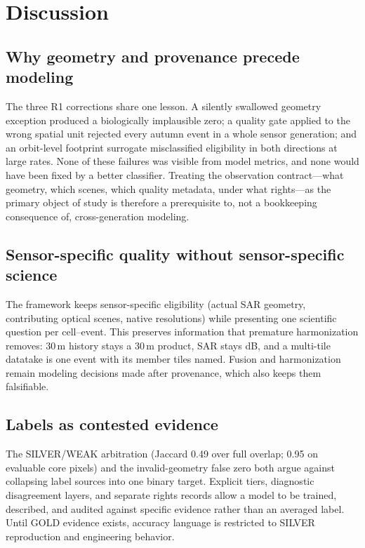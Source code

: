 \section{Discussion}\label{sec:discussion}

\subsection{Why geometry and provenance precede modeling}
The three R1 corrections share one lesson. A silently swallowed
geometry exception produced a biologically implausible zero; a quality
gate applied to the wrong spatial unit rejected every autumn event in a
whole sensor generation; and an orbit-level footprint surrogate
misclassified eligibility in both directions at large rates. None of
these failures was visible from model metrics, and none would have been
fixed by a better classifier. Treating the observation contract---what
geometry, which scenes, which quality metadata, under what rights---as
the primary object of study is therefore a prerequisite to, not a
bookkeeping consequence of, cross-generation modeling.

\subsection{Sensor-specific quality without sensor-specific science}
The framework keeps sensor-specific eligibility (actual SAR geometry,
contributing optical scenes, native resolutions) while presenting one
scientific question per cell--event. This preserves information that
premature harmonization removes: 30\,m history stays a 30\,m product,
SAR stays dB, and a multi-tile datatake is one event with its member
tiles named. Fusion and harmonization remain modeling decisions made
after provenance, which also keeps them falsifiable.

\subsection{Labels as contested evidence}
The SILVER/WEAK arbitration (Jaccard 0.49 over full overlap; 0.95 on
evaluable core pixels) and the invalid-geometry false zero both argue
against collapsing label sources into one binary target. Explicit
tiers, diagnostic disagreement layers, and separate rights records
allow a model to be trained, described, and audited against specific
evidence rather than an averaged label. Until GOLD evidence exists,
accuracy language is restricted to SILVER reproduction and engineering
behavior.

